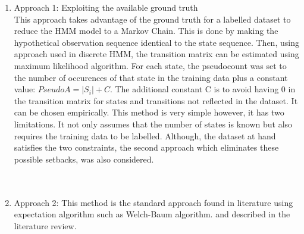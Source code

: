 \begin{enumerate}
	\item Approach 1: Exploiting the available ground truth\\
	This approach takes advantage of the ground truth for a labelled dataset to reduce the HMM model to a Markov Chain. This is done by making the hypothetical observation sequence identical to the state sequence. Then, using approach used in discrete HMM, %
	the transition matrix can be estimated using maximum likelihood algorithm. %
	For each state, the pseudocount was set to the number of occurences of that state in the training data plus a constant value: \(PseudoA = |S_i| + C\). The additional constant C is to avoid having 0 in the transition matrix for states and transitions not reflected in the dataset. It can be chosen empirically.
	This method is very simple however, it has two limitations. It not only assumes that the number of states is known but also requires the training data to be labelled. Although, the dataset at hand satisfies the two constraints, the second approach which eliminates these possible setbacks, was also considered. \\\\\
	
	\item Approach 2: This method is the standard approach found in literature using expectation algorithm such as Welch-Baum algorithm. %
	and described in the literature review. %
\end{enumerate}


